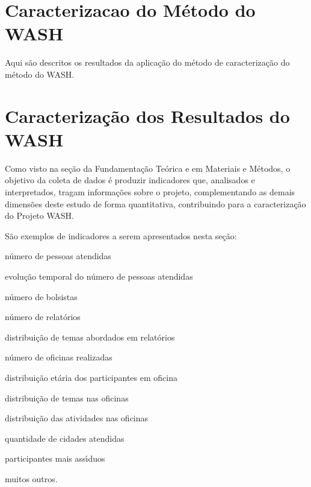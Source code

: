 \documentclass[
12pt,		%
openright,	%
twoside,  %
a4paper,			%
chapter=TITLE,		%
english,			%
french,				%
spanish,			%
brazil				%
]{USPSC-classe/USPSC_RedarTex}
\begin{document}
\section[Caracterizacao do M\'etodo do WASH]{Caracterizacao do M\'etodo do WASH}\label{Caracterizacao do M\'etodo do WASH}
Aqui s\~ao descritos os resultados da aplica\c{c}\~ao do m\'etodo de caracteriza\c{c}\~ao do m\'etodo do WASH.








\section[Caracteriza\c{c}\~ao dos Resultados do WASH]{Caracteriza\c{c}\~ao dos Resultados do WASH}\label{Caracteriza\c{c}\~ao dos Resultados do WASH}
Como visto na se\c{c}\~ao da Fundamenta\c{c}\~ao Te\'orica e em Materiais e M\'etodos, o objetivo da coleta de dados \'e produzir indicadores que, analisados e interpretados, tragam informa\c{c}\~oes sobre o projeto, complementando as demais dimens\~oes deste estudo de forma quantitativa, contribuindo para a caracteriza\c{c}\~ao do Projeto WASH.








S\~ao exemplos de indicadores a serem apresentados nesta se\c{c}\~ao:









\begin{alineas}
\item n\'umero de pessoas atendidas
\item evolu\c{c}\~ao temporal do n\'umero de pessoas atendidas
\item n\'umero de bolsistas
\item n\'umero de relat\'orios
\item distribui\c{c}\~ao de temas abordados em relat\'orios
\item n\'umero de oficinas realizadas
\item distribui\c{c}\~ao et\'aria dos participantes em oficina
\item distribui\c{c}\~ao de temas nas oficinas
\item distribui\c{c}\~ao das atividades nas oficinas
\item quantidade de cidades atendidas
\item participantes mais ass\'{\i}duos
\item muitos outros.
\end{alineas}
\end{document}
